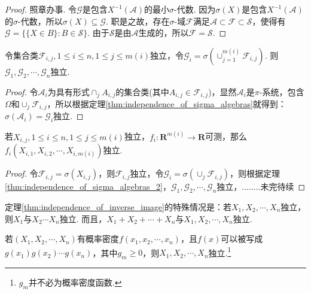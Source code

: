 \begin{proof}
    照章办事. 令$\mathcal{G}$是包含$X^{-1}(\mathcal{A})$的最小$\sigma$-代数. 因为$\sigma(X)$是包含$X^{-1}(\mathcal{A})$的$\sigma$-代数，所以$\sigma(X)\subseteq \mathcal{G}$. 职是之故，存在$\sigma$-域$\mathcal{F}$满足$\mathcal{A}\subset \mathcal{F}\subset\mathcal{S}$，使得有$\mathcal{G}=\{\{X\in B\}:B\in\mathcal{S}\}$. 由于$\mathcal{S}$是由$\mathcal{A}$生成的，所以$\mathcal{F}=\mathcal{S}$.
\end{proof}

\begin{theorem}\label{thm:independence_of_sigma_algebras_2}
    令集合类$\mathcal{F}_{i,j},1\le i\le n,1\le j\le m(i)$独立，令$\mathcal{G}_i=\sigma(\cup_{j=1}^{m(i)}\mathcal{F}_{i,j})$. 则$\mathcal{G}_1,\mathcal{G}_2,\cdots,\mathcal{G}_n$独立.
\end{theorem}

\begin{proof}
    令$\mathcal{A}_i$为具有形式$\cap_j A_{i,j}$的集合类(其中$A_{i,j}\in\mathcal{F}_{i,j}$)，显然$\mathcal{A}_i$是$\pi$-系统，包含$\Omega$和$\cup_j\mathcal{F}_{i,j}$，所以根据定理\ref{thm:independence_of_sigma_algebras}就得到：$\sigma(\mathcal{A}_i)=\mathcal{G}_i$独立.
\end{proof}

\begin{theorem}\label{thm:independence_of_inverse_image}
    若$X_{i,j},1\le i\le n,1\le j\le m(i)$独立，$f_i:\mathbf{R}^{m(i)}\to \mathbf{R}$可测，那么$f_i(X_{i,1},X_{i,2},\cdots,X_{i,m(i)})$独立.
\end{theorem}

\begin{proof}
    令$\mathcal{F}_{i,j}=\sigma(X_{i,j})$，则$\mathcal{F}_{i,j}$独立，令$\mathcal{G}_i=\sigma(\cup_j\mathcal{F}_{i,j})$，则根据定理\ref{thm:independence_of_sigma_algebras_2}，$\mathcal{G}_1,\mathcal{G}_2,\cdots,\mathcal{G}_n$独立，........未完待续
\end{proof}

定理\ref{thm:independence_of_inverse_image}的特殊情况是：若$X_1,X_2,\cdots,X_n$独立，则$X_1$与$X_2\cdots X_n$独立. 而且，$X_1+X_2+\cdots+X_n$与$X_1,X_2,\cdots ,X_n$独立.

\begin{exercise}
    若$(X_1,X_2,\cdots,X_n)$有概率密度$f(x_1,x_2,\cdots,x_n)$，且$f(x)$可以被写成$g(x_1)g(x_2)\cdots g(x_n)$，其中$g_m\ge 0$，则$X_1,X_2,\cdots,X_n$独立.\footnote{$g_m$并不必为概率密度函数.}
\end{exercise}

